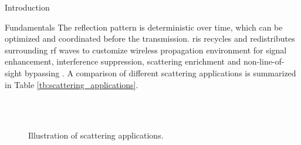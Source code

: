 \documentclass[journal]{IEEEtran}
\begin{document}
\begin{section}{Introduction}
\begin{subsection}{Fundamentals}
		The reflection pattern is deterministic over time, which can be optimized and coordinated before the transmission.
		\gls{ris} recycles and redistributes surrounding \gls{rf} waves to customize wireless propagation environment for signal enhancement, interference suppression, scattering enrichment and non-line-of-sight bypassing \cite{Wu2021b}.
		A comparison of different scattering applications is summarized in Table \ref{tb:scattering_applications}.
		\begin{figure}[!t]
			\centering
			\\
			\subfloat[\gls{sr}]{
				\resizebox{0.48\linewidth}{!}{
					
				}
				\label{fg:sr}
			}
			\\
			\subfloat[RIScatter]{
				\resizebox{0.48\linewidth}{!}{
					
				}
				\label{fg:riscatter}
			}
			\caption{
				Illustration of scattering applications.
			}
			\label{fg:scatter_illustration}
		\end{figure}
	\end{subsection}


\end{section}
\end{document}
